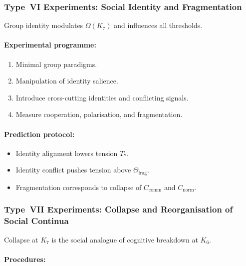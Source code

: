 \subsubsection{Type~VI Experiments: Social Identity and Fragmentation}

Group identity modulates $\Omega(K_7)$ and influences all thresholds.

\paragraph{Experimental programme:}

\begin{enumerate}
    \item Minimal group paradigms.
    \item Manipulation of identity salience.
    \item Introduce cross-cutting identities and conflicting signals.
    \item Measure cooperation, polarisation, and fragmentation.
\end{enumerate}

\paragraph{Prediction protocol:}

\begin{itemize}
    \item Identity alignment lowers tension $T_7$.
    \item Identity conflict pushes tension above $\Theta_{\mathrm{frag}}$.
    \item Fragmentation corresponds to collapse of
          $C_{\mathrm{comm}}$ and $C_{\mathrm{norm}}$.
\end{itemize}



\subsubsection{Type~VII Experiments: Collapse and Reorganisation of Social Continua}

Collapse at $K_7$ is the social analogue of cognitive breakdown at $K_6$.

\paragraph{Procedures:}

